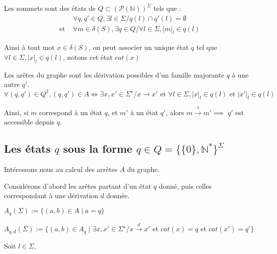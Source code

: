 \documentclass[a4paper,12pt]{article}
\newcommand{\norm}[1]{\lvert #1 \rvert}
\begin{document}
Les sommets sont des états de $Q \subset ({\mathcal{P}(\mathbb{N})})^{\Sigma}$ tels que :
\begin{align*}
    &\forall q,q' \in Q, \exists l \in \Sigma / q(l) \cap q'(l) = \emptyset\\
    \text{ et }&\forall m \in \delta(S), \exists q \in Q / \forall l \in \Sigma, \norm{m}_l \in q(l)
\end{align*}

Ainsi à tout mot $x \in \delta(S)$, on peut associer un unique état $q$ tel que $\forall l \in \Sigma, \norm{x}_l \in q(l)$, notons cet état $cat(x)$

Les arêtes du graphe sont les dérivation possibles d'un famille majorante $q$ à une autre $q'$.
\begin{equation*}
    \forall (q,q') \in Q^2, (q,q') \in A \iff \exists x,x' \in \Sigma^\star / x \rightarrow x' \text{ et } \forall l \in \Sigma, \norm{x}_l \in q(l) \text{ et } \norm{x'}_l \in q(l)
\end{equation*}

Ainsi, si $m$ correspond à un état $q$, et $m'$ à un état $q'$, alors $m \overset{*}{\rightarrow} m' \implies$ $q'$ est accessible depuis $q$.

\subsection{Les états $q$ sous la forme $q \in Q = \{\{0\},\mathbb{N}^*\}^{\Sigma}$}








Intéressons nous au calcul des arrêtes $A$ du graphe.

Considérons d'abord les arêtes partant d'un état $q$ donné, puis celles correspondant à une dérivation $d$ donnée.

$A_q(\Sigma) := \{(a,b) \in A \mid a = q\}$

$A_{q,d}(\Sigma) := \{(a,b) \in A_q \mid \exists x,x' \in \Sigma^\star / x \overset{d}{\rightarrow} x' \text{ et } cat(x) = q \text{ et } cat(x') = q'\}$

Soit $l \in \Sigma$,
\end{document}

